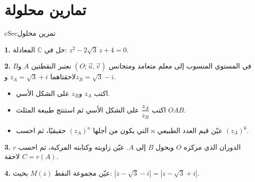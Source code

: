 \documentclass[12pt,a4paper]{article}
\newenvironment{BOX}[2]{\begin{otherlanguage}{english}\begin{arbox}{#1}{#2}}{\end{arbox}\end{otherlanguage}}
\newcounter{exo}
\newenvironment{sq}{\begin{itemize}[leftmargin=2.4em,itemsep=3pt]}{\end{itemize}}
\newcommand{\qa}{\item[(أ)]}\newcommand{\qb}{\item[(ب)]}\newcommand{\qc}{\item[(جـ)]}\newcommand{\qd}{\item[(د)]}\newcommand{\qe}{\item[(هـ)]}
\newcommand{\QQ}[1]{\par\smallskip\textbf{#1.} }
\newenvironment{tmr}{\stepcounter{exo}\begin{BOX}{cSec}{تمرين محلول \theexo}}{\end{BOX}}
\begin{document}
\section{تمارين محلولة}
\begin{tmr}
\QQ{1} حل في $\mathbb{C}$ المعادلة: \quad $z^2-2\sqrt3\,z+4=0$.
\QQ{2} في المستوي المنسوب إلى معلم متعامد ومتجانس $(O;\vec u,\vec v)$ نعتبر النقطتين $A$ و$B$ لاحقتاهما $z_A=\sqrt3+i$ و$z_B=\sqrt3-i$.
\begin{sq}
\qa اكتب $z_A$ و$z_B$ على الشكل الأسي.
\qb اكتب $\dfrac{z_A}{z_B}$ على الشكل الأسي ثم استنتج طبيعة المثلث $OAB$.
\qc عيّن قيم العدد الطبيعي $n$ التي يكون من أجلها $(z_A)^n$ حقيقيًا، ثم احسب $(z_A)^6$.
\end{sq}
\QQ{3} $r$ الدوران الذي مركزه $O$ ويحول $B$ إلى $A$. عيّن زاويته وكتابته المركبة، ثم احسب لاحقة $C=r(A)$.
\QQ{4} عيّن مجموعة النقط $M(z)$ بحيث: $|z-\sqrt3-i|=|z-\sqrt3+i|$.
\end{tmr}
\end{document}
